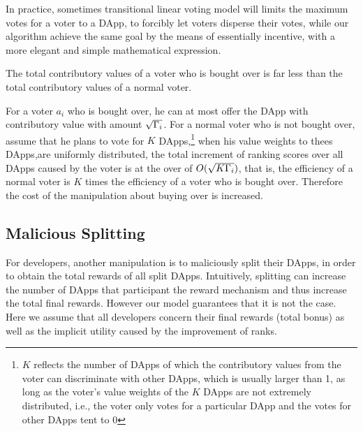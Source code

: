 In practice, sometimes transitional  linear voting model will limits the maximum votes for a voter to a DApp, to forcibly let voters disperse their votes, while our algorithm achieve the same goal by the means of essentially incentive,  with a more elegant and simple mathematical expression.

\begin{corollary}
	The total contributory values of a  voter who is bought over is far less than the total contributory values of a normal voter.
\end{corollary}
For a voter $a_i$ who is bought over, he can at most offer the DApp with contributory value with amount $\sqrt{\Gamma_i}$. For a normal voter who is not bought over, assume that he plans to vote for $K$ DApps,\footnote{$K$ reflects the number of DApps of which the contributory values from the voter can discriminate with other DApps, which is usually larger than 1, as long as the voter's value weights of the $K$ DApps are not extremely distributed, i.e., the voter only votes for a particular DApp and the votes for other DApps tent to 0} when  his value weights to thees DApps,are uniformly distributed, the total increment of ranking scores  over all DApps caused by the voter is at the over of $O(\sqrt{K\Gamma_i})$, that is, the efficiency of a normal voter is $K$ times the efficiency of a voter who is bought over. Therefore the cost of the manipulation about buying over is increased.

\subsection{Malicious Splitting}
\label{subsec:5.2}
For developers, another manipulation is to maliciously split their DApps, in order to obtain the total rewards of all split DApps. Intuitively, splitting can increase the number of DApps that participant the reward mechanism and thus increase the total final rewards. However our model guarantees that it is not the case. Here we assume that all developers concern their final rewards (total bonus) as well as the implicit utility caused by the improvement of ranks.

